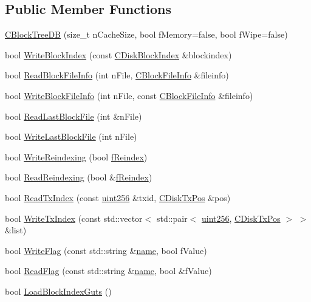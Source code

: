 \subsection*{Public Member Functions}
\begin{DoxyCompactItemize}
\item 
\hyperlink{class_c_block_tree_d_b_a52fd1b1dc02c2a4e977099e2c2c50424}{C\+Block\+Tree\+D\+B} (size\+\_\+t n\+Cache\+Size, bool f\+Memory=false, bool f\+Wipe=false)
\item 
bool \hyperlink{class_c_block_tree_d_b_a608a04a08445d95e477cb66889c679d0}{Write\+Block\+Index} (const \hyperlink{class_c_disk_block_index}{C\+Disk\+Block\+Index} \&blockindex)
\item 
bool \hyperlink{class_c_block_tree_d_b_a6f951198dc53fbe9194626ff82638656}{Read\+Block\+File\+Info} (int n\+File, \hyperlink{class_c_block_file_info}{C\+Block\+File\+Info} \&fileinfo)
\item 
bool \hyperlink{class_c_block_tree_d_b_ae248032ee1f1303dea54a0b36ad84755}{Write\+Block\+File\+Info} (int n\+File, const \hyperlink{class_c_block_file_info}{C\+Block\+File\+Info} \&fileinfo)
\item 
bool \hyperlink{class_c_block_tree_d_b_adb1276fe2f0e0c4c106660948c581711}{Read\+Last\+Block\+File} (int \&n\+File)
\item 
bool \hyperlink{class_c_block_tree_d_b_ae1f4ea54edf05a056d2da00ea90a9394}{Write\+Last\+Block\+File} (int n\+File)
\item 
bool \hyperlink{class_c_block_tree_d_b_a8fa5d150b98f4fd1aa8cf503eddfccef}{Write\+Reindexing} (bool \hyperlink{main_8h_a8e0eca589b2d4254a65f04c5d91888b2}{f\+Reindex})
\item 
bool \hyperlink{class_c_block_tree_d_b_a1abf6fc392048428aa24a12b7942824b}{Read\+Reindexing} (bool \&\hyperlink{main_8h_a8e0eca589b2d4254a65f04c5d91888b2}{f\+Reindex})
\item 
bool \hyperlink{class_c_block_tree_d_b_a74383427266d627e84c2d0c8e21e03c7}{Read\+Tx\+Index} (const \hyperlink{classuint256}{uint256} \&txid, \hyperlink{class_c_disk_tx_pos}{C\+Disk\+Tx\+Pos} \&pos)
\item 
bool \hyperlink{class_c_block_tree_d_b_a1e03745f9675ad352a1483a0aa7ef308}{Write\+Tx\+Index} (const std\+::vector$<$ std\+::pair$<$ \hyperlink{classuint256}{uint256}, \hyperlink{class_c_disk_tx_pos}{C\+Disk\+Tx\+Pos} $>$ $>$ \&list)
\item 
bool \hyperlink{class_c_block_tree_d_b_af2f65b70ac5d8a198d4f29a7e909c08a}{Write\+Flag} (const std\+::string \&\hyperlink{testharness_8cc_a8f8f80d37794cde9472343e4487ba3eb}{name}, bool f\+Value)
\item 
bool \hyperlink{class_c_block_tree_d_b_acd779c4653fd9a87fffe95d53ce7c6d3}{Read\+Flag} (const std\+::string \&\hyperlink{testharness_8cc_a8f8f80d37794cde9472343e4487ba3eb}{name}, bool \&f\+Value)
\item 
bool \hyperlink{class_c_block_tree_d_b_a12be19bb1d7253eeb40e1aa88b032346}{Load\+Block\+Index\+Guts} ()
\end{DoxyCompactItemize}


